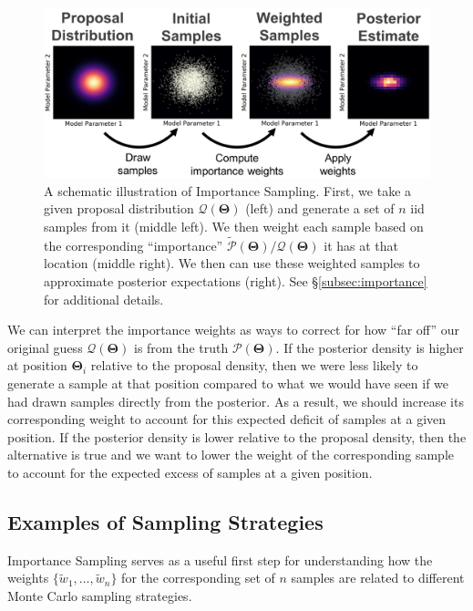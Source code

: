 \documentclass[12pt, titlepage]{article}
\newcommand{\params}{\ensuremath{\boldsymbol\Theta}}
\newcommand{\posterior}{\ensuremath{\mathcal{P}}}
\newcommand{\proposal}{\ensuremath{\mathcal{Q}}}
\begin{document}
\begin{figure}
\begin{center}
\includegraphics[width=\textwidth]{figures/fig7.png}
\end{center}
\caption{A schematic illustration of Importance Sampling.
First, we take a given proposal distribution 
$\proposal(\params)$ (left) and generate a set of $n$ iid samples
from it (middle left).
We then weight each sample based on the corresponding
``importance'' $\tilde{\posterior}(\params)/\proposal(\params)$
it has at that location (middle right). We then can use these
weighted samples to approximate posterior expectations
(right).
See \S\ref{subsec:importance} for additional details.
}\label{fig:importance}
\end{figure}

We can interpret the importance weights as ways to correct for how
``far off'' our original guess $\proposal(\params)$ 
is from the truth $\posterior(\params)$.
If the posterior density is higher at position
$\params_i$ relative to the proposal density, 
then we were less likely to generate
a sample at that position compared to what we would have
seen if we had drawn samples directly from the posterior.
As a result, we should increase its corresponding weight
to account for this expected deficit of samples at a given position.
If the posterior density is lower relative to the proposal density, 
then the alternative is true and we want to lower the weight of the
corresponding sample to account for the expected excess of samples
at a given position.

\subsection{Examples of Sampling Strategies} \label{subsection:samp_strat}

Importance Sampling serves as a useful first step for understanding how
the weights $\{ \tilde{w}_1, \dots, \tilde{w}_n \}$ for the corresponding set 
of $n$ samples are related to different Monte Carlo sampling strategies.
\end{document}
